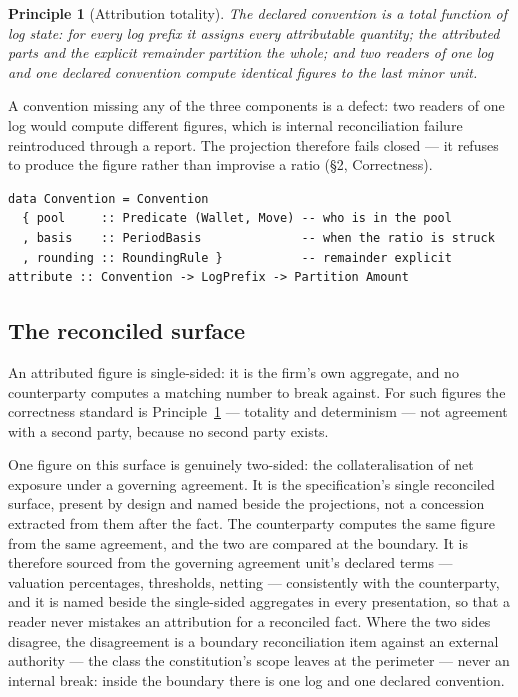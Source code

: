 \documentclass[11pt,a4paper]{article}
\newtheorem{principle}[definition]{Principle}
\begin{document}
\begin{principle}[Attribution totality]\label{prin:attr-total}
The declared convention is a total function of log state: for every log prefix
it assigns every attributable quantity; the attributed parts and the explicit
remainder partition the whole; and two readers of one log and one declared
convention compute identical figures to the last minor unit.
\end{principle}

A convention missing any of the three components is a defect: two readers of
one log would compute different figures, which is internal reconciliation
failure reintroduced through a report. The projection therefore fails closed
--- it refuses to produce the figure rather than improvise a ratio (\S 2,
Correctness).

\begin{lstlisting}
data Convention = Convention
  { pool     :: Predicate (Wallet, Move) -- who is in the pool
  , basis    :: PeriodBasis              -- when the ratio is struck
  , rounding :: RoundingRule }           -- remainder explicit
attribute :: Convention -> LogPrefix -> Partition Amount
\end{lstlisting}

\subsection{The reconciled surface}

An attributed figure is single-sided: it is the firm's own aggregate, and no
counterparty computes a matching number to break against. For such figures the
correctness standard is Principle~\ref{prin:attr-total} --- totality and
determinism --- not agreement with a second party, because no second party
exists.

One figure on this surface is genuinely two-sided: the collateralisation of net
exposure under a governing agreement. It is the specification's single reconciled
surface, present by design and named beside the projections, not a concession
extracted from them after the fact. The counterparty computes the same figure
from the same agreement, and the two are compared at the boundary. It is
therefore sourced from the governing agreement unit's declared terms ---
valuation percentages, thresholds, netting --- consistently with the
counterparty, and it is named beside the single-sided aggregates in every
presentation, so that a reader never mistakes an attribution for a reconciled
fact. Where the two sides disagree, the disagreement is a boundary
reconciliation item against an external authority --- the class the
constitution's scope leaves at the perimeter --- never an internal break: inside
the boundary there is one log and one declared convention.
\end{document}
